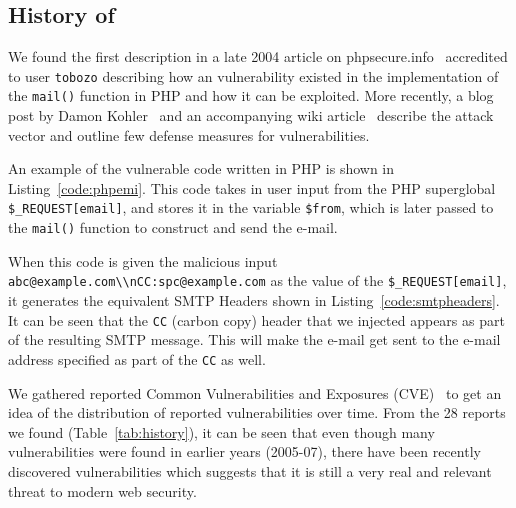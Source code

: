 \subsection{History of \ehi}

We found the first \ehi description in a late 2004 article on phpsecure.info~\cite{Tobozo} accredited to user \lstinline|tobozo| describing how an \ehi vulnerability existed in the implementation of the \texttt{mail()} function in PHP and how it can be exploited. More recently, a blog post by Damon Kohler~\cite{DK} and an accompanying wiki article~\cite{Injection} describe the attack vector and outline few defense measures for \ehi vulnerabilities.


An example of the vulnerable code written in PHP is shown in Listing~\ref{code:phpemi}. This code takes in user input from the PHP superglobal \texttt{\$\_REQUEST[\textquotesingle email\textquotesingle]}, and stores it in the variable \texttt{\$from}, which is later passed to the \texttt{mail()} function to construct and send the e-mail.



\begin{sloppypar}
When this code is given the malicious input \texttt{\lstinline{abc@example.com\\nCC:spc@example.com}} as the value of the \texttt{\$\_REQUEST[\textquotesingle email\textquotesingle]}, it generates the equivalent SMTP Headers shown in Listing~\ref{code:smtpheaders}. It can be seen that the \texttt{CC} (carbon copy) header that we injected appears as part of the resulting SMTP message. This will make the e-mail get sent to the e-mail address specified as part of the \texttt{CC} as well. 

%
\end{sloppypar}

We gathered reported Common Vulnerabilities and Exposures
(CVE)~\cite{cve} to get an idea of the distribution of
reported \ehi vulnerabilities over time. From the 28 reports we found (Table~\ref*{tab:history}), it can be seen that even though many vulnerabilities were found in earlier years (2005-07), there have been recently discovered \ehi vulnerabilities which suggests that it is still a very real and relevant threat to modern web security.


